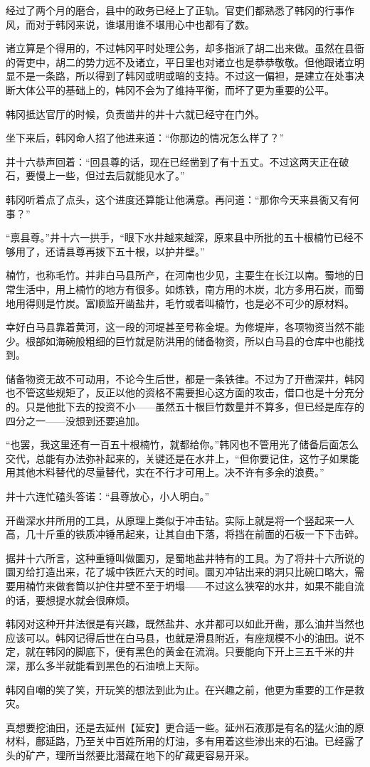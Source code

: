 经过了两个月的磨合，县中的政务已经上了正轨。官吏们都熟悉了韩冈的行事作风，而对于韩冈来说，谁堪用谁不堪用心中也都有了数。

诸立算是个得用的，不过韩冈平时处理公务，却多指派了胡二出来做。虽然在县衙的胥吏中，胡二的势力远不及诸立，平日里也对诸立也是恭恭敬敬。但他跟诸立明显不是一条路，所以得到了韩冈或明或暗的支持。不过这一偏袒，是建立在处事决断大体公平的基础上的，韩冈不会为了维持平衡，而坏了更为重要的公平。

韩冈抵达官厅的时候，负责凿井的井十六就已经守在门外。

坐下来后，韩冈命人招了他进来道：“你那边的情况怎么样了？”

井十六恭声回着：“回县尊的话，现在已经凿到了有十五丈。不过这两天正在破石，要慢上一些，但过去后就能见水了。”

韩冈听着点了点头，这个进度还算能让他满意。再问道：“那你今天来县衙又有何事？”

“禀县尊。”井十六一拱手，“眼下水井越来越深，原来县中所批的五十根楠竹已经不够用了，还请县尊再拨下五十根，以护井壁。”

楠竹，也称毛竹。并非白马县所产，在河南也少见，主要生在长江以南。蜀地的日常生活中，用上楠竹的地方有很多。如炼铁，南方用的木炭，北方多用石炭，而蜀地用得则是竹炭。富顺监开凿盐井，毛竹或者叫楠竹，也是必不可少的原材料。

幸好白马县靠着黄河，这一段的河堤甚至号称金堤。为修堤岸，各项物资当然不能少。根部如海碗般粗细的巨竹就是防洪用的储备物资，所以白马县的仓库中也能找到。

储备物资无故不可动用，不论今生后世，都是一条铁律。不过为了开凿深井，韩冈也不管这些规矩了，反正以他的资格不需要担心这方面的攻击，借口也是十分充分的。只是他批下去的投资不小——虽然五十根巨竹数量并不算多，但已经是库存的四分之一——没想到还要追加。

“也罢，我这里还有一百五十根楠竹，就都给你。”韩冈也不管用光了储备后面怎么交代，总能有办法弥补起来的，关键还是在水井上，“但你要记住，这竹子如果能用其他木料替代的尽量替代，实在不行才可用上。决不许有多余的浪费。”

井十六连忙磕头答诺：“县尊放心，小人明白。”

开凿深水井所用的工具，从原理上类似于冲击钻。实际上就是将一个竖起来一人高，几十斤重的铁质冲锤吊起来，让其自由下落，将挡在前面的石板一下下击碎。

据井十六所言，这种重锤叫做圜刃，是蜀地盐井特有的工具。为了将井十六所说的圜刃给打造出来，花了城中铁匠六天的时间。圜刃冲钻出来的洞只比碗口略大，需要用楠竹来做套筒以护住井壁不至于坍塌——不过这么狭窄的水井，如果不能自流的话，要想提水就会很麻烦。

韩冈对这种开井法很是有兴趣，既然盐井、水井都可以如此开凿，那么油井当然也应该可以。韩冈记得后世在白马县，也就是滑县附近，有座规模不小的油田。说不定，就在韩冈的脚底下，便有黑色的黄金在流淌。只要能向下开上三五千米的井深，那么多半就能看到黑色的石油喷上天际。

韩冈自嘲的笑了笑，开玩笑的想法到此为止。在兴趣之前，他更为重要的工作是救灾。

真想要挖油田，还是去延州【延安】更合适一些。延州石液那是有名的猛火油的原材料，鄜延路，乃至关中百姓所用的灯油，多有用着这些渗出来的石油。已经露了头的矿产，理所当然要比潜藏在地下的矿藏更容易开采。

